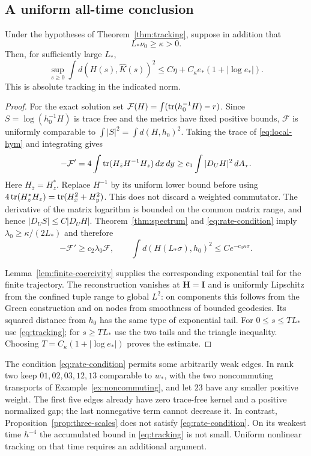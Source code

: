 \subsection{A uniform all-time conclusion}
\begin{theorem}\label{thm:all-time}
Under the hypotheses of Theorem~\ref{thm:tracking},
suppose in addition that
\begin{equation}\label{eq:rate-condition}
 L_*\nu_0\ge\kappa>0.
\end{equation}
Then, for sufficiently large $L_*$,
\[
 \sup_{s\ge0}\int d(H(s),\widehat K(s))^2
 \le C\eta+C_\kappa e_*(1+|\log e_*|).
\]
This is absolute tracking in the indicated norm.
\end{theorem}
\begin{proof}
For the exact solution set
$\mathcal F(H)=\int(\operatorname{tr}(h_0^{-1}H)-r)$.
Since $S=\log(h_0^{-1}H)$ is trace free and the
metrics have fixed positive bounds,
$\mathcal F$ is uniformly comparable to
$\int|S|^2=\int d(H,h_0)^2$. Taking the trace
of \eqref{eq:local-hym} and integrating gives
\[
 -\mathcal F'
 =4\int\operatorname{tr}(H_{\bar z}H^{-1}H_z)\,dx\,dy
 \ge c_1\int|D_UH|^2\,dA_\tau .
\]
Here $H_{\bar z}=H_z^*$. Replace $H^{-1}$ by
its uniform lower bound before using
$4\operatorname{tr}(H_z^*H_z)=\operatorname{tr}(H_x^2+H_y^2)$.
This does not discard a weighted commutator.
The derivative of the matrix logarithm is bounded
on the common matrix range, and hence
$|D_US|\le C|D_UH|$. Theorem~\ref{thm:spectrum}
and \eqref{eq:rate-condition} imply
$\lambda_0\ge\kappa/(2L_*)$ and therefore
\[
 -\mathcal F'\ge c_2\lambda_0\mathcal F,\qquad
 \int d(H(L_*\sigma),h_0)^2
       \le C e^{-c_3\kappa\sigma}.
\]

Lemma~\ref{lem:finite-coercivity} supplies the
corresponding exponential tail for the finite
trajectory. The reconstruction vanishes at
$\mathbf H=\mathbf I$ and is uniformly Lipschitz
from the confined tuple range to global $L^2$:
on components this follows from the Green
construction and on nodes from smoothness of
bounded geodesics. Its squared distance from
$h_0$ has the same type of exponential tail.
For $0\le s\le TL_*$ use \eqref{eq:tracking};
for $s\ge TL_*$ use the two tails and the
triangle inequality. Choosing
$T=C_\kappa(1+|\log e_*|)$ proves the estimate.
\end{proof}

The condition \eqref{eq:rate-condition} permits
some arbitrarily weak edges. In rank two keep
$01,02,03,12,13$ comparable to $w_*$, with the
two noncommuting transports of
Example~\ref{ex:noncommuting}, and let $23$
have any smaller positive weight. The first
five edges already have zero trace-free
kernel and a positive normalized gap; the
last nonnegative term cannot decrease it.
In contrast, Proposition~\ref{prop:three-scales}
does not satisfy \eqref{eq:rate-condition}.
On its weakest time $h^{-4}$ the accumulated
bound in \eqref{eq:tracking} is not small.
Uniform nonlinear tracking on that time
requires an additional argument.
